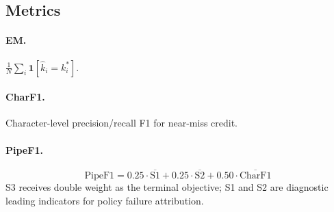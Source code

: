 \subsection{Metrics}
\label{sec:metrics}

\paragraph{EM.}
$\frac{1}{N}\sum_i \mathbf{1}[\hat{k}_i = k^*_i]$.

\paragraph{CharF1.}
Character-level precision/recall F1 for near-miss credit.

\paragraph{PipeF1.}
\begin{equation}
\text{PipeF1} = 0.25\cdot\overline{\text{S1}} + 0.25\cdot\overline{\text{S2}} + 0.50\cdot\overline{\text{CharF1}}
\end{equation}
S3 receives double weight as the terminal objective; S1 and S2 are diagnostic
leading indicators for policy failure attribution.
